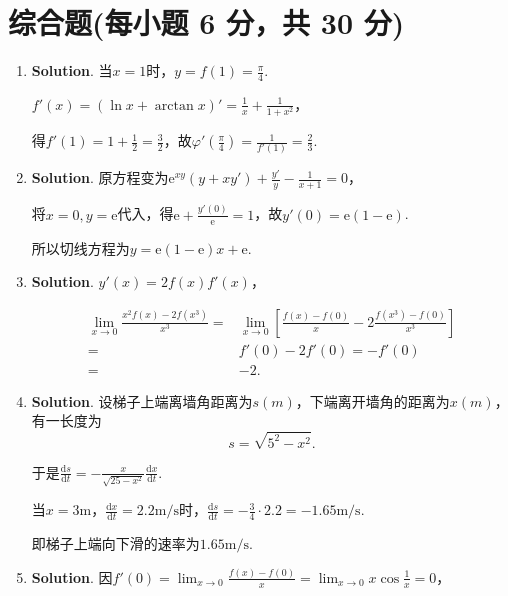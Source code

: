 \documentclass[../Main.tex]{subfiles}
\begin{document}
  \section{综合题(每小题 6 分，共 30 分)}
  \begin{enumerate}
    \item[11.] \textbf{Solution}. 当$x=1$时，$y=f(1)=\frac{\pi}{4}$.

      $f'(x)=\left(\ln x+\arctan x\right)'=\frac{1}{x}+\frac{1}{1+x^{2}}$，

      得$f'(1)=1+\frac{1}{2}=\frac{3}{2}$，故$\varphi'\left(\frac{\pi}{4}\right)=
      \frac{1}{f'(1)}=\frac{2}{3}$.

    \item[12.] \textbf{Solution}. 原方程变为$\mathrm{e}^{xy}(y+xy')+\frac{y'}{y}-
      \frac{1}{x+1}=0$，

      将$x=0,y=\mathrm{e}$代入，得$\mathrm{e}+\frac{y'(0)}{\mathrm{e}}=1$，故$y'(
      0)=\mathrm{e}(1-\mathrm{e})$.

      所以切线方程为$y=\mathrm{e}(1-\mathrm{e})x+\mathrm{e}$.

    \item[13.] \textbf{Solution}. $y'(x)=2f(x)f'(x)$，

      \[
        \begin{aligned}
          \lim_{x\to0}\frac{x^2f(x)-2f(x^3)}{x^3}= & \lim_{x\to0}\left[\frac{f(x)-f(0)}{x}-2\frac{f(x^3)-f(0)}{x^3}\right] \\
          =                                        & f'(0)-2f'(0)=-f'(0)                                                   \\
          =                                        & -2.
        \end{aligned}
      \]

    \item[14.] \textbf{Solution}. 设梯子上端离墙角距离为$s(m)$，下端离开墙角的距离为$x
      (m)$，有一长度为
      \[
        s=\sqrt{5^{2}-x^{2}}.
      \]

      于是$\frac{\mathrm{d}s}{\mathrm{d}t}=-\frac{x}{\sqrt{25-x^{2}}}\frac{\mathrm{d}x}{\mathrm{d}t}$.

      当$x=3\mathrm{m}$，$\frac{\mathrm{d}x}{\mathrm{d}t}=2.2\mathrm{m/s}$时，$\frac{\mathrm{d}s}{\mathrm{d}t}
      =-\frac{3}{4}\cdot2.2=-1.65\mathrm{m/s}$.

      即梯子上端向下滑的速率为$1.65\mathrm{m/s}$.

    \item[15.] \textbf{Solution}. 因$f'(0)=\lim_{x\to0}\frac{f(x)-f(0)}{x}=\lim_{x\to0}
      x\cos\frac{1}{x}=0$，


\end{enumerate}
\end{document}
